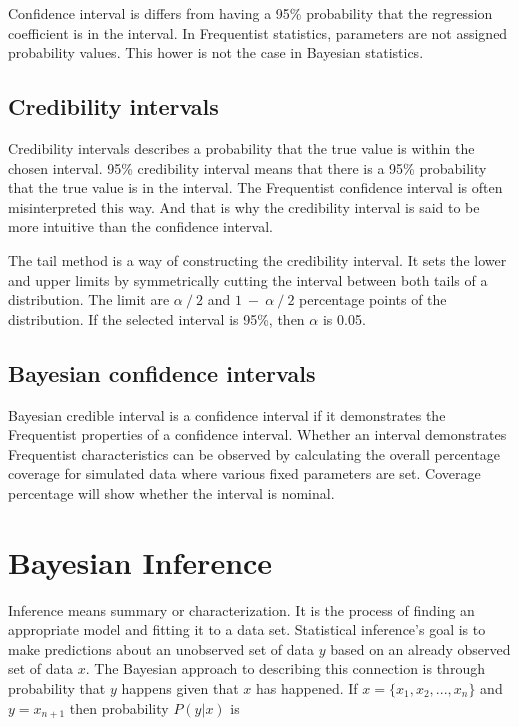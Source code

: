 Confidence interval is differs from having a 95\% probability that the regression coefficient is in the interval. In Frequentist statistics, parameters are not assigned probability values. \cite{FornaconWood2022UnderstandingTD} This hower is not the case in Bayesian statistics.

\subsection{Credibility intervals}\label{CredibilityIntervals}

Credibility intervals describes a probability that the true value is within the chosen interval. 95\% credibility interval means that there is a 95\% probability that the true value is in the interval. The Frequentist confidence interval is often misinterpreted this way. And that is why the credibility interval is said to be more intuitive than the confidence interval.\cite{FornaconWood2022UnderstandingTD} 

The tail method is a way of constructing the credibility interval. It sets the lower and upper limits by symmetrically cutting the interval between both tails of a distribution. The limit are $\alpha\ /\ 2$ and $1\ -\ \alpha\ /\ 2$ percentage points of the distribution. If the selected interval is 95\%, then $\alpha$ is 0.05. \cite{Shi2009BayesianCI}

\subsection{Bayesian confidence intervals}\label{BayesianConfidenceIntervals}

Bayesian credible interval is a confidence interval if it demonstrates the Frequentist properties of a confidence interval. Whether an interval demonstrates Frequentist characteristics can be observed by calculating the overall percentage coverage for simulated data where various fixed parameters are set. \cite{Pirikahu2016BayesianMO} \cite{Shi2009BayesianCI} Coverage percentage will show whether the interval is nominal. \cite{Pirikahu2016BayesianMO} 

\section{Bayesian Inference}\label{BayesianInference}

Inference means summary or characterization\cite{Robert2007TheBC}. It is the process of finding an appropriate model and fitting it to a data set.\cite{Gel2014BayesianDA} Statistical inference's goal is to make predictions about an unobserved set of data $y$ based on an already observed set of data $x$.\cite{Lindley1990The1W}\cite{Gel2014BayesianDA} The Bayesian approach to describing this connection is through probability that $y$ happens given that $x$ has happened. If $x = \{x_1, x_2, ..., x_n \}$ and $y = x_{n + 1}$ then probability $P(y|x)$ is

